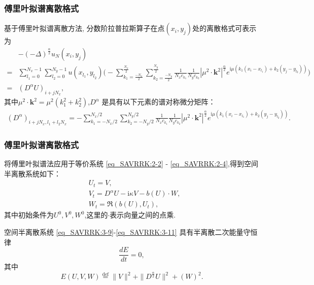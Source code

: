 \documentclass[aspectratio=169]{beamer}
\numberwithin{theorem}{section} %
\numberwithin{equation}{section}%
\numberwithin{figure}{section}%
\numberwithin{table}{section}%
\begin{document}
\begin{frame}\frametitle{傅里叶拟谱离散格式}
	基于傅里叶拟谱离散方法, 分数阶拉普拉斯算子在点$(x_i,y_j)$处的离散格式可表示为
\begin{align}
&-(-\Delta)^{\frac{\alpha}{2}} u_{N}\left(x_{i}, y_{j}\right)\nonumber\\
=&\sum\limits_{l_{1}=0}^{N_{x}-1} \sum\limits_{l_{2}=0}^{N_{y}-1}u(x_{l_{1}}, y_{l_{2}})\Big(-\sum\limits_{k_{1}=\frac{-N_{x}}{2}}^{\frac{N_{x}}{2}} \sum\limits_{k_{2}=\frac{-N_{y}}{2}}^{\frac{N_{y}}{2}} \frac{1}{N_{x} c_{k_{1}}} \frac{1}{N_{y} c_{k_{2}}}\left|\mu^{2} \cdot \mathbf{k}^{2}\right|^{\frac{\alpha}{2}} e^{\mathrm{i} \mu\left(k_{1}\left(x_{i}-x_{l_{1}}\right)+k_{2}\left(y_{j}-y_{l_{2}}\right)\right)}\Big)\nonumber\\
=&\left(D^{\alpha}U\right)_{i+j N_{x}},\label{eq_SAVRRK:53}
\end{align}
其中$\mu^{2} \cdot \mathbf{k}^{2}=\mu^{2}\left(k_{1}^{2}+k_{2}^{2}\right)$,$D^{\alpha}$ 是具有以下元素的谱对称微分矩阵：
\begin{align}\label{eq_SAVRRK:54}
\left(D^{\alpha}\right)_{i+j N_{x}, l_{1}+l_{2} N_{x}}=-\sum\limits_{k_{1}=-N_{x} / 2}^{N_{x} / 2} \sum\limits_{k_{2}=-N_{y} / 2}^{N_{y} / 2}\frac{1}{N_{x} c_{k_{1}}} \frac{1}{N_{y} c_{k_{2}}}\left|\mu^{2} \cdot \mathbf{k}^{2}\right|^{\frac{\alpha}{2}} e^{\mathrm{i}\mu\left(k_{1}\left(x_{i}-x_{l_{1}}\right)+k_{2}\left(y_{j}-y_{l_{2}}\right)\right)}.
\end{align}
\end{frame}

\begin{frame}\frametitle{傅里叶拟谱离散格式}
将傅里叶拟谱法应用于等价系统 \eqref{eq_SAVRRK:2-2} - \eqref{eq_SAVRRK:2-4},得到{\color{purple}空间半离散系统}如下：
{\color{purple}\begin{align}
& U_t=V, \label{eq_SAVRRK:3-9}\\
& V_t=D^{\alpha} U-\mathrm{i}\kappa V- b(U) \cdot W, \label{eq_SAVRRK:3-10}\\
& W_t=\Re\left(b(U), U_t\right),\label{eq_SAVRRK:3-11}
\end{align}}
其中初始条件为$U^0, V^0, W^0$,这里的$\cdot$表示向量之间的点乘.
\begin{theorem}	\label{thm3}
	空间半离散系统 \eqref{eq_SAVRRK:3-9}-\eqref{eq_SAVRRK:3-11} 具有半离散二次能量守恒律
	\begin{equation}
	\frac{dE}{dt}=0, \label{eq_SAVRRK:313a}
	\end{equation}
	其中
	\begin{equation}
	E(U,V,W)\overset{\text{def}}{=}\|V\|^2 + \|D^\frac{\alpha}{2} U\|^2+\left(W\right)^2.\label{eq_SAVRRK:313}
	\end{equation}
	\end{theorem}
\end{frame}
\end{document}
